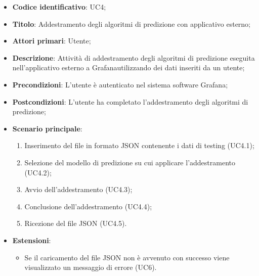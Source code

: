 \begin{itemize}
    \item \textbf{Codice identificativo}: UC4;
    \item \textbf{Titolo}: Addestramento degli algoritmi di predizione con applicativo esterno;
    \item \textbf{Attori primari}: Utente;
    \item \textbf{Descrizione}: Attività di addestramento degli algoritmi di predizione eseguita nell'applicativo esterno a Grafana\glosp utilizzando dei dati inseriti da un utente;
    \item \textbf{Precondizioni}: L'utente è autenticato nel sistema software Grafana\glo;
    \item \textbf{Postcondizioni}: L'utente ha completato l'addestramento degli algoritmi di predizione;
    \item \textbf{Scenario principale}: 
        \begin{enumerate}
            \item Inserimento del file in formato JSON contenente i dati di testing (UC4.1);
            \item Selezione del modello di predizione su cui applicare l'addestramento (UC4.2);
            \item Avvio dell'addestramento (UC4.3);
            \item Conclusione dell'addestramento (UC4.4);
            \item Ricezione del file JSON (UC4.5). 
        \end{enumerate}
    \item \textbf{Estensioni}:
    \begin{itemize}
    	\item Se il caricamento del file JSON non è avvenuto con successo viene visualizzato un messaggio di errore (UC6).
    \end{itemize}
\end{itemize}

